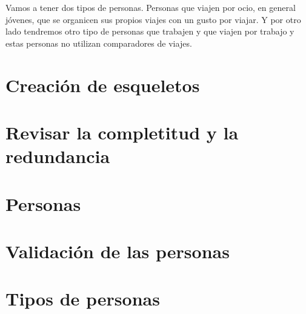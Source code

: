 Vamos a tener dos tipos de personas. Personas que viajen por ocio, en general jóvenes, que se organicen sus propios viajes con un gusto por viajar. Y por otro lado tendremos otro tipo de personas que trabajen y que viajen por trabajo y estas personas no utilizan comparadores de viajes.

\section{Creación de esqueletos}
\section{Revisar la completitud y la redundancia}
\section{Personas}
\section{Validación de las personas}
\section{Tipos de personas}